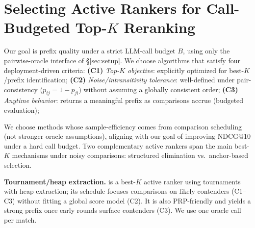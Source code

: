 \documentclass[11pt]{article}
\begin{document}


\section{Selecting Active Rankers for Call-Budgeted Top-$K$ Reranking}
\label{sec:select_active_rankers}

Our goal is prefix quality under a strict LLM-call budget $B$, using only the pairwise-oracle interface of \S\ref{sec:setup}.
We choose algorithms that satisfy four deployment-driven criteria:
\textbf{(C1)} \emph{Top-$K$ objective}: explicitly optimized for best-$K$/prefix identification;
\textbf{(C2)} \emph{Noise/intransitivity tolerance}: well-defined under pair-consistency ($p_{ij}=1-p_{ji}$) without assuming a globally consistent order;
\textbf{(C3)} \emph{Anytime behavior}: returns a meaningful prefix as comparisons accrue (budgeted evaluation);

We choose methods whose sample-efficiency comes from comparison scheduling (not stronger oracle assumptions), aligning with our goal of improving NDCG@10 under a hard call budget. Two complementary active rankers span the main best-$K$ mechanisms under noisy comparisons: structured elimination vs.\ anchor-based selection.

\noindent\textbf{Tournament/heap extraction.}
\citet{mohajer2017active} is a best-$K$ active ranker using tournaments with heap extraction; its schedule focuses comparisons on likely contenders (C1--C3) without fitting a global score model (C2).
It is also PRP-friendly and yields a strong prefix once early rounds surface contenders (C3). We use one oracle call per match.
\end{document}

